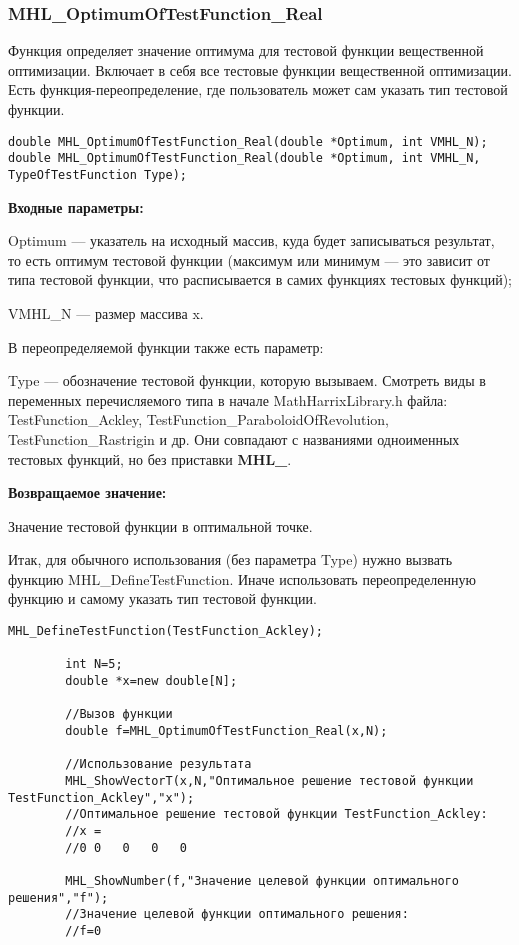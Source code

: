 \documentclass[a4paper,12pt]{article}
\begin{document}
\subsubsection{MHL\_OptimumOfTestFunction\_Real}\label{MHL_OptimumOfTestFunction_Real}

Функция определяет значение оптимума для тестовой функции вещественной оптимизации. Включает в себя все тестовые функции вещественной оптимизации. Есть функция-переопределение, где пользователь может сам указать тип тестовой функции.


\begin{lstlisting}[label=code_syntax_MHL_OptimumOfTestFunction_Real,caption=Синтаксис]
double MHL_OptimumOfTestFunction_Real(double *Optimum, int VMHL_N);
double MHL_OptimumOfTestFunction_Real(double *Optimum, int VMHL_N, TypeOfTestFunction Type);
\end{lstlisting}

\textbf{Входные параметры:}

Optimum --- указатель на исходный массив, куда будет записываться результат, то есть оптимум тестовой функции (максимум или минимум --- это зависит от типа тестовой функции, что расписывается в самих функциях тестовых функций);

     VMHL\_N --- размер массива x.

В переопределяемой функции также есть параметр:
  
Type --- обозначение тестовой функции, которую вызываем.
Смотреть виды в переменных перечисляемого типа в начале MathHarrixLibrary.h файла: TestFunction\_Ackley, TestFunction\_ParaboloidOfRevolution, TestFunction\_Rastrigin и др. Они совпадают с названиями одноименных тестовых функций, но без приставки \textbf{MHL\_}.

\textbf{Возвращаемое значение:}
 
Значение тестовой функции в оптимальной точке.

Итак, для обычного использования (без параметра Type) нужно вызвать функцию MHL\_DefineTestFunction. Иначе использовать переопределенную функцию и самому указать тип тестовой функции.


\begin{lstlisting}[label=code_use_MHL_OptimumOfTestFunction_Real,caption=Пример использования]
        MHL_DefineTestFunction(TestFunction_Ackley);

        int N=5;
        double *x=new double[N];

        //Вызов функции
        double f=MHL_OptimumOfTestFunction_Real(x,N);

        //Использование результата
        MHL_ShowVectorT(x,N,"Оптимальное решение тестовой функции TestFunction_Ackley","x");
        //Оптимальное решение тестовой функции TestFunction_Ackley:
        //x =	
        //0	0	0	0	0

        MHL_ShowNumber(f,"Значение целевой функции оптимального решения","f");
        //Значение целевой функции оптимального решения:
        //f=0
\end{lstlisting}
\end{document}
